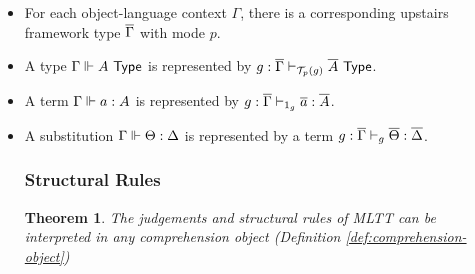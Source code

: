 \documentclass[10pt]{article}
\newtheorem{theorem}{Theorem}
\theoremstyle{definition}
\newcommand{\yields}{\vdash}
\newcommand{\TYPE}{\,\,\mathsf{Type}}
\newcommand\El[2]{\mathcal{T}_{#1}(#2)}
\begin{document}
\begin{itemize}
\item For each object-language context $\Gamma$, there is a corresponding upstairs framework type $\overline{\Gamma}$ with mode $p$.

\item A type $\Gamma \qyields A \TYPE$ is represented by $g : \upstairs{\Gamma} \yields_{\El{p}{g}} \upstairs{A} \TYPE$.
  
\item A term $\Gamma \Vdash a : A$ is represented by $g : \upstairs{\Gamma} \yields_{1_g} \upstairs{a} : \upstairs{A}$.

\item A substitution $\Gamma \Vdash \Theta : \Delta$ is represented by a term $g : \upstairs{\Gamma} \yields_g \upstairs{\Theta} : \upstairs{\Delta}$.

\subsubsection{Structural Rules}

\begin{theorem}
The judgements and structural rules of MLTT can be interpreted in any comprehension object (Definition \ref{def:comprehension-object})
\end{theorem}


\end{itemize}
\end{document}
